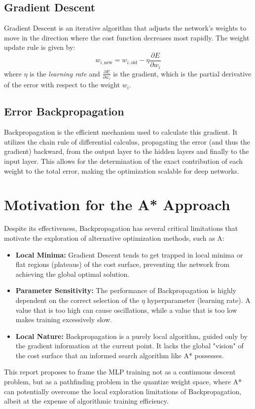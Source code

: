 \subsection{Gradient Descent}
Gradient Descent is an iterative algorithm that adjusts the network's weights to move in the direction where the cost function decreases most rapidly. The weight update rule is given by:
$$w_{i, \text{new}} = w_{i, \text{old}} - \eta \frac{\partial E}{\partial w_i}$$
where $\eta$ is the \textit{learning rate} and $\frac{\partial E}{\partial w_i}$ is the gradient, which is the partial derivative of the error with respect to the weight $w_i$.

\subsection{Error Backpropagation}
Backpropagation is the efficient mechanism used to calculate this gradient. It utilizes the chain rule of differential calculus, propagating the error (and thus the gradient) backward, from the output layer to the hidden layers and finally to the input layer. This allows for the determination of the exact contribution of each weight to the total error, making the optimization scalable for deep networks.

\section{Motivation for the A* Approach}
Despite its effectiveness, Backpropagation has several critical limitations that motivate the exploration of alternative optimization methods, such as A\*:

\begin{itemize}
    \item \textbf{Local Minima:} Gradient Descent tends to get trapped in local minima or flat regions (plateaus) of the cost surface, preventing the network from achieving the global optimal solution.
    \item \textbf{Parameter Sensitivity:} The performance of Backpropagation is highly dependent on the correct selection of the $\eta$ hyperparameter (learning rate). A value that is too high can cause oscillations, while a value that is too low makes training excessively slow.
    \item \textbf{Local Nature:} Backpropagation is a purely local algorithm, guided only by the gradient information at the current point. It lacks the global "vision" of the cost surface that an informed search algorithm like A* possesses.
\end{itemize}

This report proposes to frame the MLP training not as a continuous descent problem, but as a pathfinding problem in the quantize weight space, where A* can potentially overcome the local exploration limitations of Backpropagation, albeit at the expense of algorithmic training efficiency.


